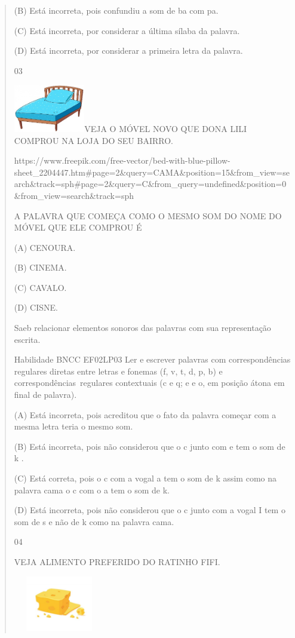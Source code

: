 {{{{\begin{verse}
{{\begin{escolha}
{{{{{(B) Está incorreta, pois confundiu a som de ba com pa.

(C) Está incorreta, por considerar a última sílaba da palavra.

(D) Está incorreta, por considerar a primeira letra da palavra.

\num{03}

\includegraphics[width=1.22293in,height=0.81839in]{media/image140.jpeg}VEJA
O MÓVEL NOVO QUE DONA LILI COMPROU NA LOJA DO SEU BAIRRO.

https://www.freepik.com/free-vector/bed-with-blue-pillow-sheet\_2204447.htm\#page=2\&query=CAMA\&position=15\&from\_view=search\&track=sph\#page=2\&query=C\&from\_query=undefined\&position=0\&from\_view=search\&track=sph

\protect\hypertarget{_Hlk129272831}{}{}A PALAVRA QUE COMEÇA COMO O MESMO
SOM DO NOME DO MÓVEL QUE ELE COMPROU É

(A) CENOURA.

(B) CINEMA.

(C) CAVALO.

(D) CISNE.

\protect\hypertarget{_Hlk129152414}{}{\protect\hypertarget{_Hlk129151771}{}{}}Saeb
relacionar elementos sonoros das palavras com sua representação escrita.

Habilidade BNCC EF02LP03 Ler e escrever palavras com correspondências
regulares diretas entre letras e fonemas (f, v, t, d, p, b) e
correspondências~regulares contextuais (c e q; e e o, em posição átona
em final de palavra).

(A) Está incorreta, pois acreditou que o fato da palavra começar com a
mesma letra teria o mesmo som.

(B) Está incorreta, pois não considerou que o c junto com e tem o som de
k .

(C) Está correta, pois o c com a vogal a tem o som de k assim como na
palavra cama o c com o a tem o som de k.

(D) Está incorreta, pois não considerou que o c junto com a vogal I tem
o som de s e não de k como na palavra cama.

\num{04}

VEJA ALIMENTO PREFERIDO DO RATINHO FIFI.

\includegraphics[width=1.56736in,height=0.94861in]{media/image141.jpeg}

}}}}}
\end{escolha}}}
\end{verse}}}}}
